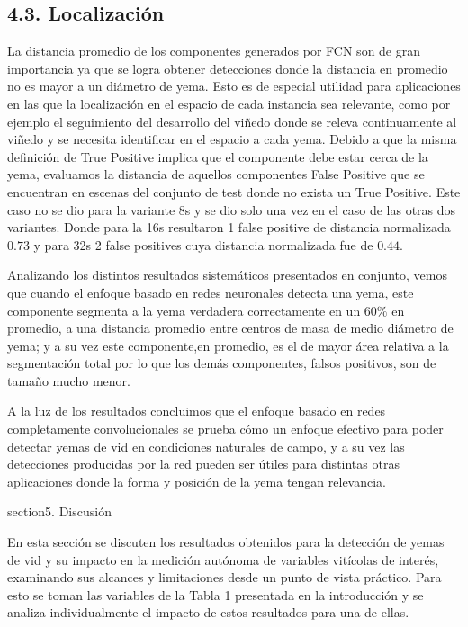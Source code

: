 \documentclass[a4paper,authoryear,review]{elsarticle}
\begin{document}
\subsection{4.3. Localización}
La distancia promedio de los componentes generados por FCN son de gran importancia ya que se logra obtener detecciones donde la distancia en promedio no es mayor a un diámetro de yema. Esto es de especial utilidad para aplicaciones en las que la localización en el espacio de cada instancia sea relevante, como por ejemplo el seguimiento del desarrollo del viñedo donde se releva continuamente al viñedo y se necesita identificar en el espacio a cada yema. Debido a que la misma definición de True Positive implica que el componente debe estar cerca de la yema, evaluamos la distancia de aquellos componentes False Positive que se encuentran en escenas del conjunto de test donde no exista un True Positive. Este caso no se dio para la variante 8s y se dio solo una vez en el caso de las otras dos variantes. Donde para la 16s resultaron 1 false positive de distancia normalizada $0.73$ y para 32s 2 false positives cuya distancia normalizada fue de $0.44$.

Analizando los distintos resultados sistemáticos presentados en conjunto, vemos que cuando el enfoque basado en redes neuronales detecta una yema, este componente segmenta a la yema verdadera correctamente en un $60\%$ en promedio, a una distancia promedio entre centros de masa de medio diámetro de yema; y a su vez este componente,en promedio, es el de mayor área relativa a la segmentación total por lo que los demás componentes, falsos positivos, son de tamaño mucho menor.

A la luz de los resultados concluimos que el enfoque basado en redes completamente convolucionales se prueba cómo un enfoque efectivo para poder detectar yemas de vid en condiciones naturales de campo, y a su vez las detecciones producidas por la red pueden ser útiles para distintas otras aplicaciones donde la forma y posición de la yema tengan relevancia.

section{5. Discusión}

En esta sección se discuten los resultados obtenidos para la detección de yemas de vid y su impacto en la medición autónoma de variables vitícolas de interés, examinando sus  alcances y limitaciones desde un punto de vista práctico. Para esto se toman las variables de la Tabla 1 presentada en la introducción y se analiza individualmente el impacto de estos resultados para una de ellas.
\end{document}
